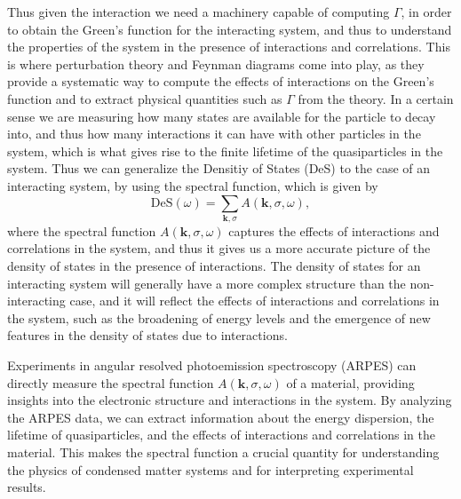 Thus given the interaction we need a machinery capable of computing \(\Gamma\), in order to obtain the Green's function for the interacting system, and thus to understand the properties of the system in the presence of interactions and correlations. This is where perturbation theory and Feynman diagrams come into play, as they provide a systematic way to compute the effects of interactions on the Green's function and to extract physical quantities such as \(\Gamma\) from the theory. In a certain sense we are measuring how many states are available for the particle to decay into, and thus how many interactions it can have with other particles in the system, which is what gives rise to the finite lifetime of the quasiparticles in the system. Thus we can generalize the Densitiy of States (DeS) to the case of an interacting system, by using the spectral function, which is given by
\[
    \mathrm{DeS}(\omega) = \sum_{\mathbf{k}, \sigma} A(\mathbf{k}, \sigma, \omega),
\]
where the spectral function \(A(\mathbf{k}, \sigma, \omega)\) captures the effects of interactions and correlations in the system, and thus it gives us a more accurate picture of the density of states in the presence of interactions. The density of states for an interacting system will generally have a more complex structure than the non-interacting case, and it will reflect the effects of interactions and correlations in the system, such as the broadening of energy levels and the emergence of new features in the density of states due to interactions.

Experiments in angular resolved photoemission spectroscopy (ARPES) can directly measure the spectral function \(A(\mathbf{k}, \sigma, \omega)\) of a material, providing insights into the electronic structure and interactions in the system. By analyzing the ARPES data, we can extract information about the energy dispersion, the lifetime of quasiparticles, and the effects of interactions and correlations in the material. This makes the spectral function a crucial quantity for understanding the physics of condensed matter systems and for interpreting experimental results.
